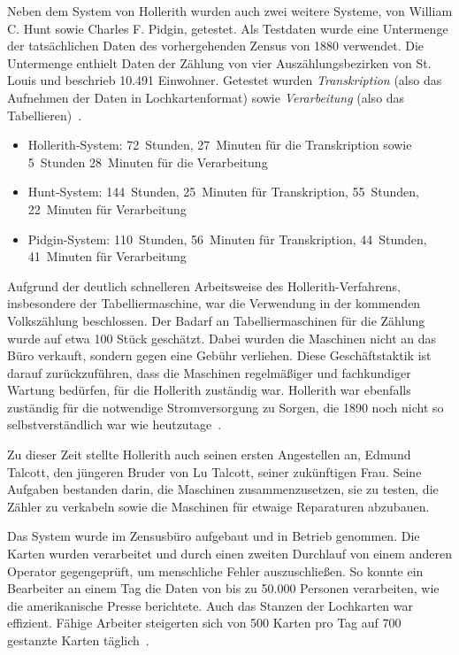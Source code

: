 \documentclass[parskip=half]{scrartcl}
\begin{document}
Neben dem System von Hollerith wurden auch zwei weitere Systeme, von William C.
Hunt sowie Charles F. Pidgin, getestet. Als Testdaten wurde eine Untermenge der
tatsächlichen Daten des vorhergehenden Zensus von 1880 verwendet. Die
Untermenge enthielt Daten der Zählung von vier Auszählungsbezirken von St.
Louis und beschrieb 10.491 Einwohner. Getestet wurden \emph{Transkription}
(also das Aufnehmen der Daten in Lochkartenformat) sowie \emph{Verarbeitung}
(also das Tabellieren)~\cite{austrian1982herman}.

\begin{itemize}
  \item Hollerith-System: 72~Stunden, 27~Minuten für die Transkription sowie
    5~Stunden 28~Minuten für die Verarbeitung
  \item Hunt-System: 144~Stunden, 25~Minuten für Transkription, 55~Stunden,
    22~Minuten für Verarbeitung
  \item Pidgin-System: 110~Stunden, 56~Minuten für Transkription,
    44~Stunden, 41~Minuten für Verarbeitung
\end{itemize}

Aufgrund der deutlich schnelleren Arbeitsweise des Hollerith-Verfahrens,
insbesondere der Tabelliermaschine, war die Verwendung in der kommenden
Volkszählung beschlossen. Der Badarf an Tabelliermaschinen für die Zählung
wurde auf etwa 100 Stück geschätzt. Dabei wurden die Maschinen nicht an das
Büro verkauft, sondern gegen eine Gebühr verliehen. Diese Geschäftstaktik ist
darauf zurückzuführen, dass die Maschinen regelmäßiger und fachkundiger Wartung
bedürfen, für die Hollerith zuständig war. Hollerith war ebenfalls zuständig
für die notwendige Stromversorgung zu Sorgen, die 1890 noch nicht so
selbstverständlich war wie heutzutage~\cite{austrian1982herman}.

Zu dieser Zeit stellte Hollerith auch seinen ersten Angestellen an, Edmund
Talcott, den jüngeren Bruder von Lu Talcott, seiner zukünftigen Frau. Seine
Aufgaben bestanden darin, die Maschinen zusammenzusetzen, sie zu testen, die
Zähler zu verkabeln sowie die Maschinen für etwaige Reparaturen abzubauen.

Das System wurde im Zensusbüro aufgebaut und in Betrieb genommen. Die Karten
wurden verarbeitet und durch einen zweiten Durchlauf von einem anderen Operator
gegengeprüft, um menschliche Fehler auszuschließen. So konnte ein Bearbeiter
an einem Tag die Daten von bis zu 50.000 Personen verarbeiten, wie die
amerikanische Presse berichtete. Auch das Stanzen der Lochkarten war effizient.
Fähige Arbeiter steigerten sich von 500 Karten pro Tag auf 700 gestanzte Karten
täglich~\cite{austrian1982herman}.
\end{document}
